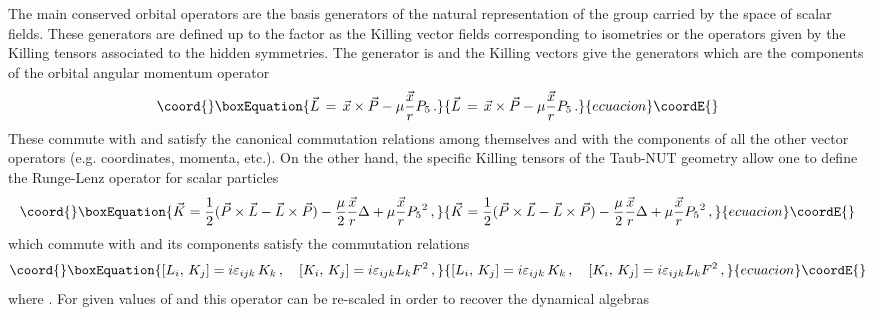 \documentclass[a4paper,12pt]{article}
\begin{document}
The main conserved orbital operators are  the basis generators of the 
natural representation of the group \coordHE{} carried by the space of 
scalar fields. These generators are defined up to the factor 
\coordHE{} as the Killing vector fields corresponding to isometries or the 
operators given by the Killing tensors associated to the hidden symmetries. 
The  \coordHE{} generator is \coordHE{} and the  Killing vectors 
\coordHE{} give the \coordHE{} generators which are the components \coordHE{} 
of the orbital angular momentum operator \cite{CV2,CV4}
\begin{equation}\coord{}\boxEquation{\label{(angmom)}
\vec{L}\,=\,\vec{x}\times\vec{P}-\mu\frac{\vec{x}}{r}P_{5}\,.
}{\vec{L}\,=\,\vec{x}\times\vec{P}-\mu\frac{\vec{x}}{r}P_{5}\,.
}{ecuacion}\coordE{}\end{equation} 
These commute with \myHighlight{$\Delta$}\coordHE{} and satisfy the canonical commutation 
relations among themselves and with the components of all the other 
vector operators (e.g. coordinates,  momenta, etc.). On the other hand, 
the specific Killing tensors \coordHE{} of the Taub-NUT geometry 
allow one to define the Runge-Lenz operator for scalar particles 
\cite{GRFH}
\begin{equation}\coord{}\boxEquation{\label{RLorb}   
\vec{K}=
\frac{1}{2}(\vec{P}\times \vec{L}-\vec{L}\times \vec{P})-
\frac{\mu}{2}\frac{\vec{x}}{r}\Delta +\mu\frac{\vec{x}}{r}{P_{5}}^{2}\,,
}{\vec{K}=
\frac{1}{2}(\vec{P}\times \vec{L}-\vec{L}\times \vec{P})-
\frac{\mu}{2}\frac{\vec{x}}{r}\Delta +\mu\frac{\vec{x}}{r}{P_{5}}^{2}\,,
}{ecuacion}\coordE{}\end{equation}
which commute with \myHighlight{$\Delta$}\coordHE{} and its components satisfy the commutation 
relations
\begin{equation}\coord{}\boxEquation{\label{algKL1}
\left[ L_{i},\, K_{j} \right] = i \varepsilon_{ijk}\,K_{k}\,,\quad
\left[ K_{i},\, K_{j} \right] = i \varepsilon_{ijk}L_{k}F^2\,, 
}{\left[ L_{i},\, K_{j} \right] = i \varepsilon_{ijk}\,K_{k}\,,\quad
\left[ K_{i},\, K_{j} \right] = i \varepsilon_{ijk}L_{k}F^2\,, 
}{ecuacion}\coordE{}\end{equation}
where \coordHE{}. For given values of \coordHE{} and \coordHE{} this 
operator can be re-scaled in order to  recover the dynamical algebras 
\end{document}
